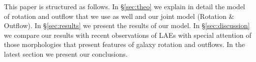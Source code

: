 \documentclass{latex/emulateapj}
\begin{document}
This paper is structured as follows. In \S \ref{sec:theo} we explain
in detail the model of rotation and outflow that we use as well and our
joint model (Rotation \& Outflow). In \S \ref{sec:results} we present
the results of our model. In \S \ref{sec:discussion} we compare our
results with recent observations of LAEs with special attention of
those morphologies that present features of galaxy rotation and
outflows. In the latest section we present our conclusions.  






\end{document}
